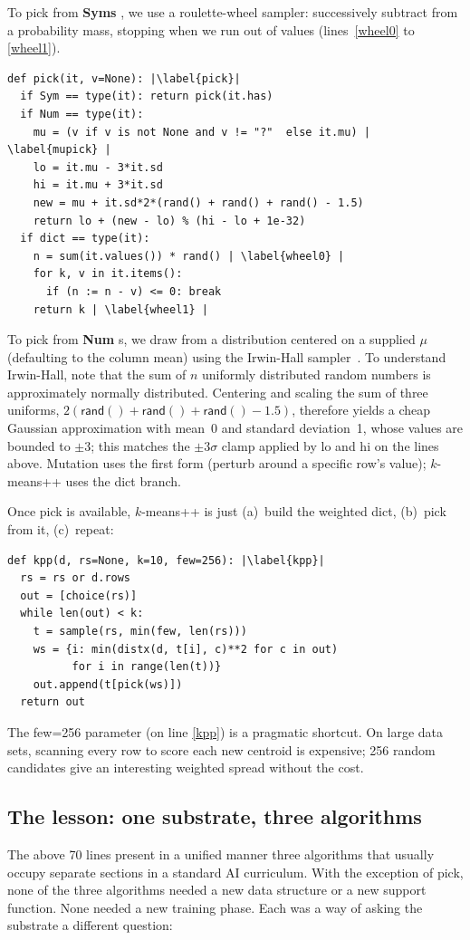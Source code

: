 \documentclass[AMA,STIX2COL]{WileyNJDv5}
\newcommand{\cls}[1]{%
  \setlength{\fboxsep}{1.5pt}%
  \colorbox{clsbg}{\sffamily\bfseries{#1}}%
}
\begin{document}
 To pick from \cls{Syms}, we use a 
roulette-wheel sampler: successively subtract from a probability mass,
stopping when we run out of values
 (lines~\ref{wheel0} to \ref{wheel1}).
\begin{verbatim}
def pick(it, v=None): |\label{pick}|
  if Sym == type(it): return pick(it.has)
  if Num == type(it):
    mu = (v if v is not None and v != "?"  else it.mu) | \label{mupick} |
    lo = it.mu - 3*it.sd
    hi = it.mu + 3*it.sd
    new = mu + it.sd*2*(rand() + rand() + rand() - 1.5)
    return lo + (new - lo) % (hi - lo + 1e-32)
  if dict == type(it):
    n = sum(it.values()) * rand() | \label{wheel0} |
    for k, v in it.items():
      if (n := n - v) <= 0: break
    return k | \label{wheel1} |
\end{verbatim}
To pick from \cls{Num}s, we draw from a distribution centered on a supplied $\mu$ (defaulting to
the column mean) using the Irwin-Hall
sampler~\cite{johnson1995continuous}. 
To understand Irwin-Hall, note that the sum of $n$ uniformly
distributed random numbers is approximately normally distributed.
Centering and scaling the sum of three uniforms,
$2(\textsf{rand}() + \textsf{rand}() + \textsf{rand}() - 1.5)$,
therefore yields a cheap Gaussian approximation with mean~0 and
standard deviation~1, whose values are bounded to $\pm 3$; this
matches the $\pm 3\sigma$ clamp applied by \textsf{lo} and
\textsf{hi} on the lines above. Mutation uses the first form (perturb around
a specific row's value); $k$-means++ uses the dict branch.

 
Once \textsf{pick} is available, $k$-means++ is just (a)~build
the weighted dict, (b)~pick from it, (c)~repeat:

\begin{verbatim}
def kpp(d, rs=None, k=10, few=256): |\label{kpp}|
  rs = rs or d.rows
  out = [choice(rs)]
  while len(out) < k:
    t = sample(rs, min(few, len(rs)))
    ws = {i: min(distx(d, t[i], c)**2 for c in out)
          for i in range(len(t))}
    out.append(t[pick(ws)])
  return out
\end{verbatim}
The \textsf{few=256} parameter  (on line \ref{kpp}) is a pragmatic shortcut. On large
data sets, scanning every row to score each new centroid is
expensive; 256 random candidates give an interesting weighted
spread without the cost.

\subsection*{The lesson: one substrate, three algorithms}
The above 70 lines present in a unified manner three algorithms that
usually occupy separate sections in a standard AI curriculum.
With the exception of \textsf{pick},
none of the three algorithms needed a new data structure or a
new support function. None needed a new training phase. Each was
a way of asking the substrate a different question:
\end{document}
